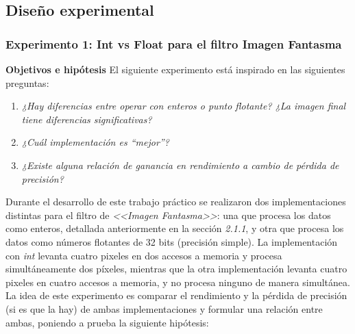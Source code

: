 \documentclass[a4paper]{article}
\begin{document}
     
\subsection{Diseño experimental}

\subsubsection{Experimento 1: Int vs Float para el filtro Imagen Fantasma}

\justify
\textbf{Objetivos e hipótesis}
\justify
El siguiente experimento está inspirado en las siguientes preguntas:
\justify
\begin{enumerate}
	\item \textit{¿Hay diferencias entre operar con enteros o punto flotante? ¿La imagen final tiene diferencias significativas?}
	\item \textit{¿Cuál implementación es “mejor”?}
	\item \textit{¿Existe alguna relación de ganancia en rendimiento a cambio de pérdida de precisión?}
\end{enumerate}

\justify
Durante el desarrollo de este trabajo práctico se realizaron dos implementaciones distintas para el filtro de \textit{<<Imagen Fantasma>>}: una que procesa los datos como enteros, detallada anteriormente en la sección \textit{2.1.1}, y otra que procesa los datos como números flotantes de 32 bits (precisión simple). La implementación con \textit{int} levanta cuatro pixeles en dos accesos a memoria y procesa simultáneamente dos píxeles, mientras que la otra implementación levanta cuatro pixeles en cuatro accesos a memoria, y no procesa ninguno de manera simultánea. La idea de este experimento es comparar el rendimiento y la pérdida de precisión (si es que la hay) de ambas implementaciones y formular una relación entre ambas, poniendo a prueba la siguiente hipótesis:
\end{document}

